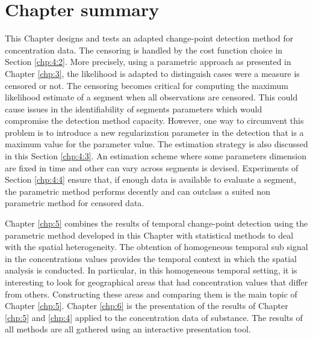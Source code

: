 \section{Chapter summary}

This Chapter designs and tests an adapted change-point detection method for concentration data. The censoring is handled by the cost function choice in Section \ref{chp:4:2}. More precisely, using a parametric approach as presented in Chapter \ref{chp:3}, the likelihood is adapted to distinguish cases were a measure is censored or not. The censoring becomes critical for computing the maximum likelihood estimate of a segment when all observations are censored. This could cause issues in the identifiability of segments parameters which would compromise the detection method capacity. However, one way to circumvent this problem is to introduce a new regularization parameter in the detection that is a maximum value for the parameter value. The estimation strategy is also discussed in this Section \ref{chp:4:3}. An estimation scheme where some parameters dimension are fixed in time and other can vary across segments is devised. Experiments of Section \ref{chp:4:4} ensure that, if enough data is available to evaluate a segment, the parametric method performs decently and can outclass a suited non parametric method for censored data. 

Chapter \ref{chp:5} combines the results of temporal change-point detection using the parametric method developed in this Chapter with statistical methods to deal with the spatial heterogeneity. The obtention of homogeneous temporal sub signal in the concentrations values provides the temporal context in which the spatial analysis is conducted. In particular, in this homogeneous temporal setting, it is interesting to look for geographical areas that had concentration values that differ from others. Constructing these areas and comparing them is the main topic of Chapter \ref{chp:5}. Chapter \ref{chp:6} is the presentation of the results of Chapter \ref{chp:5} and \ref{chp:4} applied to the concentration data of substance. The results of all methods are all gathered using an interactive presentation tool.     

       

 